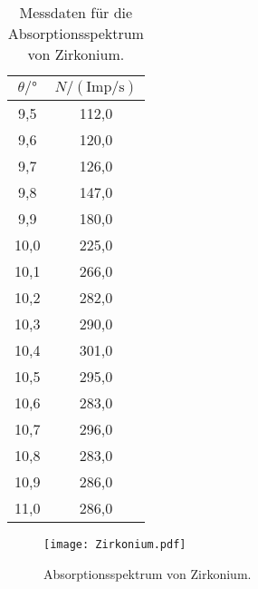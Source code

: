 \begin{table}[H]
    \centering
    \caption{Messdaten für die Absorptionsspektrum von Zirkonium.}
    \label{tab:Zirkonium}
    \begin{tabular}{|c| c|}
    \toprule
    $\theta/\mathrm{°}$ & $N/(\mathrm{Imp/s})$ \\
    \midrule
    9,5	&   112,0 \\
    9,6	&   120,0 \\
    9,7	&   126,0 \\
    9,8	&   147,0 \\
    9,9	&   180,0 \\ 
    10,0 &  225,0 \\
    10,1 &	266,0 \\
    10,2 &	282,0 \\
    10,3 &	290,0 \\
    10,4 &	301,0 \\
    10,5 &	295,0 \\
    10,6 &	283,0 \\
    10,7 &	296,0 \\
    10,8 &	283,0 \\
    10,9 &	286,0 \\
    11,0 &	286,0 \\
    \bottomrule
    \end{tabular}
\end{table}
\label{sec:Auswertung}
\begin{figure}[H]
    \centering
    \texttt{[image: Zirkonium.pdf]}
    \caption{Absorptionsspektrum von Zirkonium.}
    \label{fig:Zirkonium}
  \end{figure}

\label{sec:Anhang}